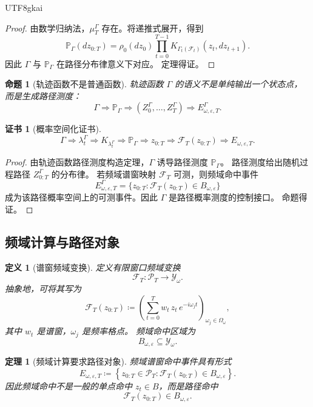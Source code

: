\documentclass[12pt]{article}
\newtheorem{definition}{定义}[section]
\newtheorem{theorem}{定理}[section]
\newtheorem{proposition}{命题}[section]
\newtheorem{Certificate}{证书}[section]
\newcommand{\DefEq}{\coloneqq}
\newcommand{\Prob}{\mathbb P}
\newcommand{\Fil}{\mathcal F}
\begin{document}
\begin{CJK*}{UTF8}{gkai}
\begin{proof}
由数学归纳法，\(\mu_T^\Gamma\) 存在。将递推式展开，得到
\[
\Prob_\Gamma(dz_{0:T})
=
\rho_0(dz_0)
\prod_{t=0}^{T-1}
K_{\Gamma_t(\Fil_t)}(z_t,dz_{t+1}).
\]
因此 \(\Gamma\) 与 \(\Prob_\Gamma\) 在路径分布律意义下对应。
定理得证。
\end{proof}

\begin{proposition}[轨迹函数不是普通函数]
轨迹函数 \(\Gamma\) 的语义不是单纯输出一个状态点，而是生成路径测度：
\[
\boxed{
\Gamma
\Longrightarrow
\Prob_\Gamma
\Longrightarrow
(Z_0^\Gamma,\ldots,Z_T^\Gamma)
\Longrightarrow
E_{\omega,\varepsilon,T}^{\Gamma}.
}
\]
\end{proposition}

\begin{Certificate}[概率空间化证书]
\[
\boxed{
\Gamma
\Rightarrow
\lambda_t^\Gamma
\Rightarrow
K_{\lambda_t^\Gamma}
\Rightarrow
\Prob_\Gamma
\Rightarrow
z_{0:T}
\Rightarrow
\mathscr F_T(z_{0:T})
\Rightarrow
E_{\omega,\varepsilon,T}.
}
\]
\end{Certificate}

\begin{proof}
由轨迹函数路径测度构造定理，\(\Gamma\) 诱导路径测度 \(\Prob_\Gamma\)。
路径测度给出随机过程路径 \(Z_{0:T}^\Gamma\) 的分布律。
若频域谱窗映射 \(\mathscr F_T\) 可测，则频域命中事件
\[
E_{\omega,\varepsilon,T}^{\Gamma}
=
\{z_{0:T}:\mathscr F_T(z_{0:T})\in B_{\omega,\varepsilon}\}
\]
成为该路径概率空间上的可测事件。因此 \(\Gamma\) 是路径概率测度的控制接口。
命题得证。
\end{proof}

\subsection{频域计算与路径对象}
\label{subsec:frequency-computation-path-object}

\begin{definition}[谱窗频域变换]
定义有限窗口频域变换
\[
\mathscr F_T:\mathcal P_T\to\mathcal Y_\omega.
\]
抽象地，可将其写为
\[
\mathscr F_T(z_{0:T})
\DefEq
\left(
\sum_{t=0}^{T}
w_t\,z_t\,e^{-i\omega_j t}
\right)_{\omega_j\in\Omega_\omega},
\]
其中 \(w_t\) 是谱窗，\(\omega_j\) 是频率格点。
频域命中区域为
\[
B_{\omega,\varepsilon}\subseteq\mathcal Y_\omega.
\]
\end{definition}

\begin{theorem}[频域计算要求路径对象]
频域谱窗命中事件具有形式
\[
\boxed{
E_{\omega,\varepsilon,T}
\DefEq
\left\{
z_{0:T}\in\mathcal P_T:
\mathscr F_T(z_{0:T})\in B_{\omega,\varepsilon}
\right\}.
}
\]
因此频域命中不是一般的单点命中 \(z_t\in B\)，而是路径命中
\[
\mathscr F_T(z_{0:T})\in B_{\omega,\varepsilon}.
\]
\end{theorem}


\end{CJK*}
\end{document}
